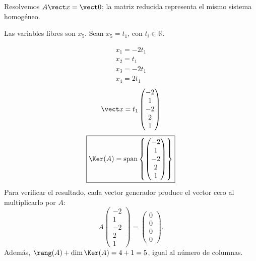 Resolvemos $A\vect x=\vect0$; la matriz reducida representa el mismo sistema homogéneo.

Las variables libres son $x_{5}$. Sean $x_{5}=t_{1}$, con $t_i\in\mathbb R$.

\[
\begin{aligned}x_{1}=- 2 t_{1}\\x_{2}=t_{1}\\x_{3}=- 2 t_{1}\\x_{4}=2 t_{1}\end{aligned}
\]
\[
\vect x=t_{1}\begin{pmatrix}-2\\1\\-2\\2\\1\end{pmatrix}
\]
\[
\boxed{\Ker(A)=\operatorname{span}\left\{\begin{pmatrix}-2\\1\\-2\\2\\1\end{pmatrix}\right\}}
\]
Para verificar el resultado, cada vector generador produce el vector cero al multiplicarlo por $A$:
\[
A\begin{pmatrix}-2\\1\\-2\\2\\1\end{pmatrix}=\begin{pmatrix}0\\0\\0\\0\end{pmatrix}.
\]
Además, $\rang(A)+\dim\Ker(A)=4+1=5$, igual al número de columnas.


\medskip
